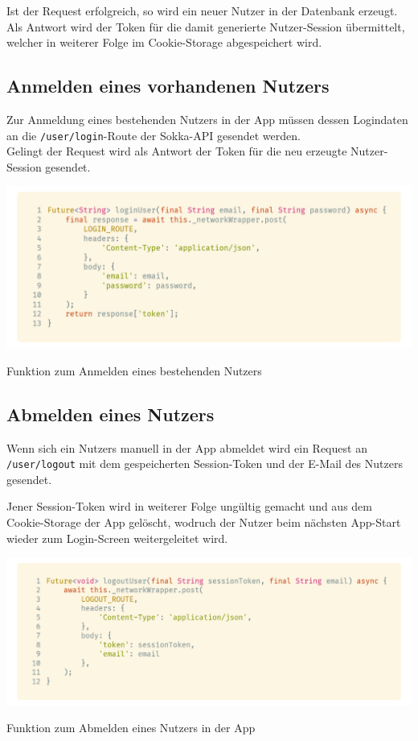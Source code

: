 Ist der Request erfolgreich, so wird ein neuer Nutzer in der Datenbank erzeugt. Als Antwort wird der
Token für die damit generierte Nutzer-Session übermittelt, welcher in weiterer Folge im Cookie-Storage
abgespeichert wird.

\subsection{Anmelden eines vorhandenen Nutzers}

Zur Anmeldung eines bestehenden Nutzers in der App müssen dessen Logindaten an die 
\lstinline{/user/login}-Route der Sokka-API gesendet werden.\\
Gelingt der Request wird als Antwort der Token für die neu erzeugte Nutzer-Session gesendet.

\begin{code}
    \centering
    \includegraphics[width=1\textwidth]{images/Client/services/user-auth/login.png}
    \caption{Funktion zum Anmelden eines bestehenden Nutzers}
\end{code}

\subsection{Abmelden eines Nutzers}

Wenn sich ein Nutzers manuell in der App abmeldet wird ein Request an \lstinline{/user/logout} mit
dem gespeicherten Session-Token und der E-Mail des Nutzers gesendet.

Jener Session-Token wird in weiterer Folge ungültig gemacht und aus dem Cookie-Storage der App
gelöscht, wodruch der Nutzer beim nächsten App-Start wieder zum Login-Screen weitergeleitet wird.

\begin{code}
    \centering
    \includegraphics[width=1\textwidth]{images/Client/services/user-auth/logout.png}
    \caption{Funktion zum Abmelden eines Nutzers in der App}
\end{code}

